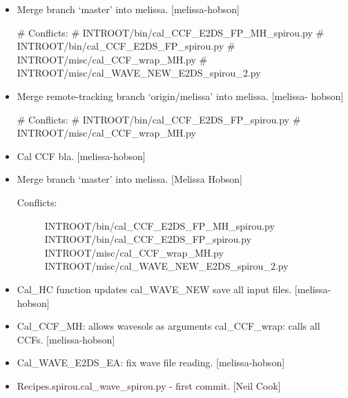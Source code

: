 \documentclass[a4paper,10pt,english]{report}
\begin{document}
\begin{itemize}
\item {} 
Merge branch ‘master’ into melissa. {[}melissa-hobson{]}

\# Conflicts:
\#     INTROOT/bin/cal\_CCF\_E2DS\_FP\_MH\_spirou.py
\#     INTROOT/bin/cal\_CCF\_E2DS\_FP\_spirou.py
\#     INTROOT/misc/cal\_CCF\_wrap\_MH.py
\#     INTROOT/misc/cal\_WAVE\_NEW\_E2DS\_spirou\_2.py

\item {} 
Merge remote-tracking branch ‘origin/melissa’ into melissa. {[}melissa-
hobson{]}

\# Conflicts:
\#     INTROOT/bin/cal\_CCF\_E2DS\_FP\_spirou.py
\#     INTROOT/misc/cal\_CCF\_wrap\_MH.py

\item {} 
Cal CCF bla. {[}melissa-hobson{]}

\item {} 
Merge branch ‘master’ into melissa. {[}Melissa Hobson{]}
\begin{description}
\item[{Conflicts:}] \leavevmode
INTROOT/bin/cal\_CCF\_E2DS\_FP\_MH\_spirou.py
INTROOT/bin/cal\_CCF\_E2DS\_FP\_spirou.py
INTROOT/misc/cal\_CCF\_wrap\_MH.py
INTROOT/misc/cal\_WAVE\_NEW\_E2DS\_spirou\_2.py

\end{description}

\item {} 
Cal\_HC function updates cal\_WAVE\_NEW save all input files. {[}melissa-
hobson{]}

\item {} 
Cal\_CCF\_MH: allows wavesols as arguments cal\_CCF\_wrap: calls all CCFs.
{[}melissa-hobson{]}

\item {} 
Cal\_WAVE\_E2DS\_EA: fix wave file reading. {[}melissa-hobson{]}

\item {} 
Recipes.spirou.cal\_wave\_spirou.py - first commit. {[}Neil Cook{]}

\end{itemize}
\end{document}

